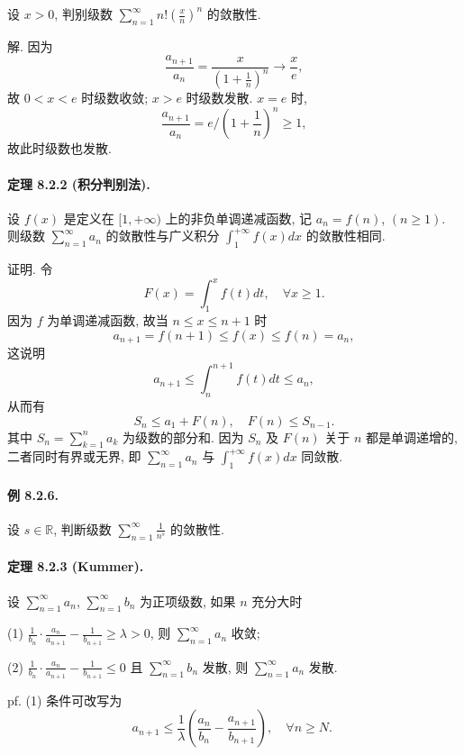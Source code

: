 设 $x>0$, 判别级数 $\sum_{n=1}^{\infty}n!\left(\frac{x}{n}\right)^{n}$
的敛散性. 

解. 因为 
\[
\frac{a_{n+1}}{a_{n}}=\frac{x}{\left(1+\frac{1}{n}\right)^{n}}\rightarrow\frac{x}{e},
\]
故 $0<x<e$ 时级数收敛; $x>e$ 时级数发散. $x=e$ 时, 
\[
\frac{a_{n+1}}{a_{n}}=e/\left(1+\frac{1}{n}\right)^{n}\geqslant1,
\]
故此时级数也发散.

\paragraph{定理 8.2.2 (积分判别法). }

设 $f(x)$ 是定义在 $[1,+\infty)$ 上的非负单调递减函数, 记 $a_{n}=f(n)$, $(n\geqslant1)$.
则级数 $\sum_{n=1}^{\infty}a_{n}$ 的敛散性与广义积分 $\int_{1}^{+\infty}f(x)dx$
的敛散性相同.

证明. 令 
\[
F(x)=\int_{1}^{x}f(t)dt,\quad\forall x\geqslant1.
\]
因为 $f$ 为单调递减函数, 故当 $n\leqslant x\leqslant n+1$ 时 
\[
a_{n+1}=f(n+1)\leqslant f(x)\leqslant f(n)=a_{n},
\]
这说明 
\[
a_{n+1}\leqslant\int_{n}^{n+1}f(t)dt\leqslant a_{n},
\]
从而有 
\[
S_{n}\leqslant a_{1}+F(n),\quad F(n)\leqslant S_{n-1}.
\]
其中 $S_{n}=\sum_{k=1}^{n}a_{k}$ 为级数的部分和. 因为 $S_{n}$ 及 $F(n)$ 关于
$n$ 都是单调递增的, 二者同时有界或无界, 即 $\sum_{n=1}^{\infty}a_{n}$ 与 $\int_{1}^{+\infty}f(x)dx$
同敛散.

\paragraph{例 8.2.6. }

设 $s\in\mathbb{R}$, 判断级数 $\sum_{n=1}^{\infty}\frac{1}{n^{s}}$ 的敛散性.

\paragraph{定理 8.2.3 (Kummer). }

设 $\sum_{n=1}^{\infty}a_{n}$, $\sum_{n=1}^{\infty}b_{n}$ 为正项级数,
如果 $n$ 充分大时 

(1) $\frac{1}{b_{n}}\cdot\frac{a_{n}}{a_{n+1}}-\frac{1}{b_{n+1}}\geqslant\lambda>0$,
则 $\sum_{n=1}^{\infty}a_{n}$ 收敛; 

(2) $\frac{1}{b_{n}}\cdot\frac{a_{n}}{a_{n+1}}-\frac{1}{b_{n+1}}\leqslant0$
且 $\sum_{n=1}^{\infty}b_{n}$ 发散, 则 $\sum_{n=1}^{\infty}a_{n}$ 发散.

pf. (1) 条件可改写为 
\[
a_{n+1}\leqslant\frac{1}{\lambda}\left(\frac{a_{n}}{b_{n}}-\frac{a_{n+1}}{b_{n+1}}\right),\quad\forall n\geqslant N\text{. }
\]

